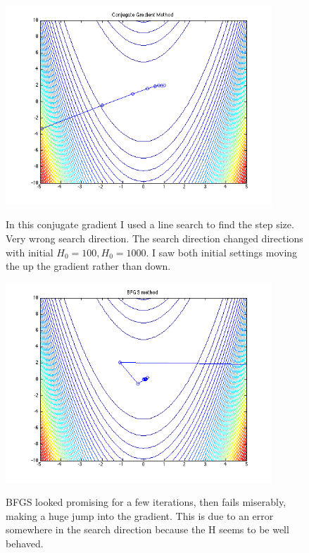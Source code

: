 \documentclass[7pt]{article}
\begin{document}
\begin{figure}
	\includegraphics[width = 10cm]{conGrad12}\\
	\caption{In this conjugate gradient I used a line search to find the step size. Very wrong search direction. The search direction changed directions with initial $H_0=100, H_0=1000$. I saw both initial settings moving the up the gradient rather than down.}
\end{figure}
\begin{figure}
	\includegraphics[width = 10cm]{bfgs0}\\
	\caption{BFGS looked promising for a few iterations, then fails miserably, making a huge jump into the gradient. This is due to an error somewhere in the search direction because the H seems to be well behaved.}
\end{figure}
\end{document}

